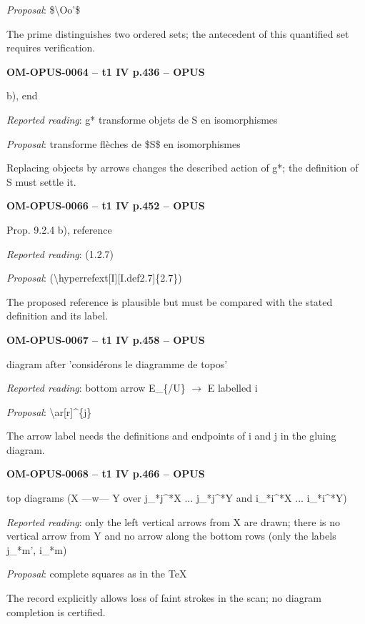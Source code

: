 \emph{Proposal}: \$\textbackslash{}Oo'\$\par
The prime distinguishes two ordered sets; the antecedent of this quantified set requires verification.\par
\par\noindent\textbf{OM-OPUS-0064 -- t1 IV p.436 -- OPUS}\par
b), end\par
\emph{Reported reading}: g* transforme objets de S en isomorphismes\par
\emph{Proposal}: transforme flèches de \$S\$ en isomorphismes\par
Replacing objects by arrows changes the described action of g*; the definition of S must settle it.\par
\par\noindent\textbf{OM-OPUS-0066 -- t1 IV p.452 -- OPUS}\par
Prop. 9.2.4 b), reference\par
\emph{Reported reading}: (1.2.7)\par
\emph{Proposal}: (\textbackslash{}hyperrefext[I][I.def2.7]\{2.7\})\par
The proposed reference is plausible but must be compared with the stated definition and its label.\par
\par\noindent\textbf{OM-OPUS-0067 -- t1 IV p.458 -- OPUS}\par
diagram after 'considérons le diagramme de topos'\par
\emph{Reported reading}: bottom arrow E\_\{/U\} \ensuremath{\to} E labelled i\par
\emph{Proposal}: \textbackslash{}ar[r]\textasciicircum{}\{j\}\par
The arrow label needs the definitions and endpoints of i and j in the gluing diagram.\par
\par\noindent\textbf{OM-OPUS-0068 -- t1 IV p.466 -- OPUS}\par
top diagrams (X —w— Y over j\_*j\textasciicircum{}*X ... j\_*j\textasciicircum{}*Y and i\_*i\textasciicircum{}*X ... i\_*i\textasciicircum{}*Y)\par
\emph{Reported reading}: only the left vertical arrows from X are drawn; there is no vertical arrow from Y and no arrow along the bottom rows (only the labels j\_*m', i\_*m)\par
\emph{Proposal}: complete squares as in the TeX\par
The record explicitly allows loss of faint strokes in the scan; no diagram completion is certified.\par
